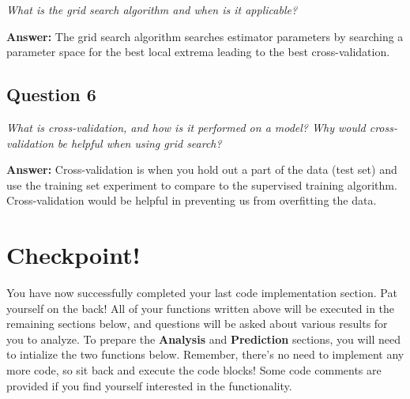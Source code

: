 \documentclass{article}
\begin{document}
\emph{What is the grid search algorithm and when is it applicable?}

    \textbf{Answer: } The grid search algorithm searches estimator
parameters by searching a parameter space for the best local extrema
leading to the best cross-validation.

    \subsection{Question 6}\label{question-6}

\emph{What is cross-validation, and how is it performed on a model? Why
would cross-validation be helpful when using grid search?}

    \textbf{Answer: } Cross-validation is when you hold out a part of the
data (test set) and use the training set experiment to compare to the
supervised training algorithm. Cross-validation would be helpful in
preventing us from overfitting the data.

    \section{Checkpoint!}\label{checkpoint}

You have now successfully completed your last code implementation
section. Pat yourself on the back! All of your functions written above
will be executed in the remaining sections below, and questions will be
asked about various results for you to analyze. To prepare the
\textbf{Analysis} and \textbf{Prediction} sections, you will need to
intialize the two functions below. Remember, there's no need to
implement any more code, so sit back and execute the code blocks! Some
code comments are provided if you find yourself interested in the
functionality.
\end{document}
